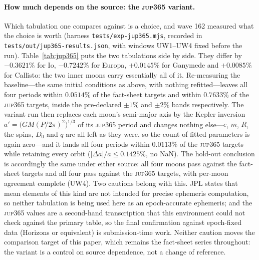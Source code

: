 \documentclass[aps,reprint,amsmath,amssymb,nofootinbib,superscriptaddress,floatfix]{revtex4-2}
\begin{document}
\paragraph*{How much depends on the source: the \textsc{jup365}
variant.}
Which tabulation one compares against is a choice, and wave 162
measured what the choice is worth (harness
\texttt{tests/exp-jup365.mjs}, recorded in
\texttt{tests/out/\allowbreak jup365-\allowbreak results.json}, with
windows UW1--UW4 fixed before the run).
Table~\ref{tab:jup365} puts the two tabulations side by side.
They differ by $-0.3621\%$ for Io, $-0.7242\%$ for Europa,
$+0.0145\%$ for Ganymede and $+0.0085\%$ for Callisto: the two inner
moons carry essentially all of it.
Re-measuring the baseline---the same initial conditions as above, with
nothing refitted---leaves all four periods within $0.0514\%$ of the
fact-sheet targets and within $0.7633\%$ of the \textsc{jup365}
targets, inside the pre-declared $\pm1\%$ and $\pm2\%$ bands
respectively.
The variant run then replaces each moon's semi-major axis by the Kepler
inversion $a'=\bigl(GM(P/2\pi)^{2}\bigr)^{1/3}$ of its \textsc{jup365}
period and changes nothing else---$e$, $m$, $R$, the spins, $D_0$ and
$q$ are all left as they were, so the count of fitted parameters is
again zero---and it lands all four periods within $0.0113\%$ of the
\textsc{jup365} targets while retaining every orbit
($|\Delta a|/a\leq0.1425\%$, no NaN).
The hold-out conclusion is accordingly the same under either source:
all four moons pass against the fact-sheet targets and all four pass
against the \textsc{jup365} targets, with per-moon agreement complete
(UW4).
Two cautions belong with this.
JPL states that mean elements of this kind are not intended for precise
ephemeris computation, so neither tabulation is being used here as an
epoch-accurate ephemeris; and the \textsc{jup365} values are a
second-hand transcription that this environment could not check against
the primary table, so the final confirmation against epoch-fixed data
(Horizons or equivalent) is submission-time work.
Neither caution moves the comparison target of this paper, which
remains the fact-sheet series throughout: the variant is a control on
source dependence, not a change of reference.
\end{document}
